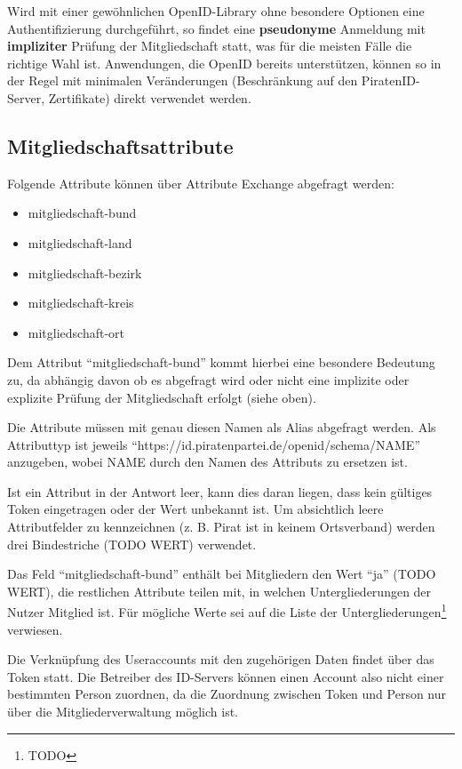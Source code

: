 Wird mit einer gewöhnlichen OpenID-Library ohne besondere Optionen eine Authentifizierung durchgeführt, 
so findet eine \textbf{pseudonyme} Anmeldung mit \textbf{impliziter} Prüfung der Mitgliedschaft statt, was für die meisten Fälle die richtige Wahl ist.
Anwendungen, die OpenID bereits unterstützen, können so in der Regel mit minimalen Veränderungen (Beschränkung auf den PiratenID-Server, Zertifikate) direkt verwendet werden.

\subsection{Mitgliedschaftsattribute}
Folgende Attribute können über Attribute Exchange abgefragt werden:
\label{sec:attribute}
\begin{itemize}
\item mitgliedschaft-bund
\item mitgliedschaft-land
\item mitgliedschaft-bezirk
\item mitgliedschaft-kreis
\item mitgliedschaft-ort
\end{itemize}

Dem Attribut "`mitgliedschaft-bund"' kommt hierbei eine besondere Bedeutung zu,
da abhängig davon ob es abgefragt wird oder nicht eine implizite oder explizite Prüfung der Mitgliedschaft erfolgt (siehe oben).

Die Attribute müssen mit genau diesen Namen als Alias abgefragt werden.
Als Attributtyp ist jeweils "`https://id.piratenpartei.de/openid/schema/NAME"' anzugeben, wobei NAME durch den Namen des Attributs zu ersetzen ist.

Ist ein Attribut in der Antwort leer, kann dies daran liegen, dass kein gültiges Token eingetragen oder der Wert unbekannt ist.
Um absichtlich leere Attributfelder zu kennzeichnen (z. B. Pirat ist in keinem Ortsverband) werden drei Bindestriche (TODO WERT) verwendet.

Das Feld "`mitgliedschaft-bund"' enthält bei Mitgliedern den Wert "`ja"' (TODO WERT),
die restlichen Attribute teilen mit, in welchen Untergliederungen der Nutzer Mitglied ist.
Für mögliche Werte sei auf die Liste der Untergliederungen\footnote{TODO} verwiesen.

Die Verknüpfung des Useraccounts mit den zugehörigen Daten findet über das Token statt.
Die Betreiber des ID-Servers können einen Account also nicht einer bestimmten Person zuordnen,
da die Zuordnung zwischen Token und Person nur über die Mitgliederverwaltung möglich ist.


